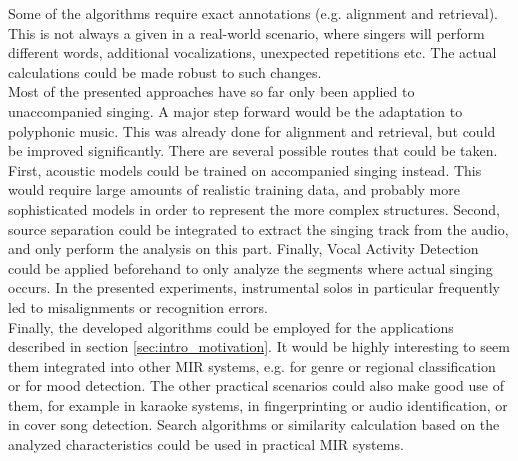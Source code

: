 Some of the algorithms require exact annotations (e.g. alignment and retrieval). This is not always a given in a real-world scenario, where singers will perform different words, additional vocalizations, unexpected repetitions etc. The actual calculations could be made robust to such changes.\\

Most of the presented approaches have so far only been applied to unaccompanied singing. A major step forward would be the adaptation to polyphonic music. This was already done for alignment and retrieval, but could be improved significantly. There are several possible routes that could be taken. First, acoustic models could be trained on accompanied singing instead. This would require large amounts of realistic training data, and probably more sophisticated models in order to represent the more complex structures. Second, source separation could be integrated to extract the singing track from the audio, and only perform the analysis on this part. Finally, Vocal Activity Detection could be applied beforehand to only analyze the segments where actual singing occurs. In the presented experiments, instrumental solos in particular frequently led to misalignments or recognition errors.\\

Finally, the developed algorithms could be employed for the applications described in section \ref{sec:intro_motivation}. It would be highly interesting to seem them integrated into other MIR systems, e.g. for genre or regional classification or for mood detection. The other practical scenarios could also make good use of them, for example in karaoke systems, in fingerprinting or audio identification, or in cover song detection. Search algorithms or similarity calculation based on the analyzed characteristics could be used in practical MIR systems.
